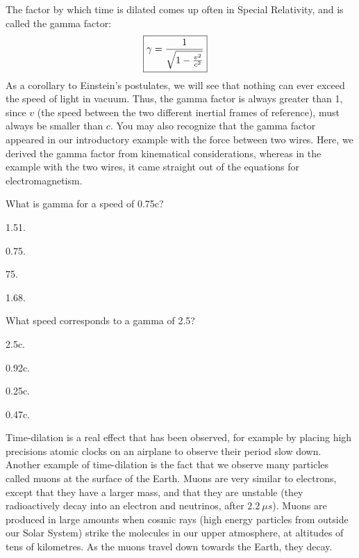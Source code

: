 The factor by which time is dilated comes up often in Special Relativity, and is called the gamma factor:
\begin{align*}
\Aboxed{\gamma = \frac{1}{\sqrt{1-\frac{v^2}{c^2}}}}
\end{align*}
As a corollary to Einstein's postulates, we will see that nothing can ever exceed the speed of light in vacuum. Thus, the gamma factor is always greater than 1, since $v$ (the speed between the two different inertial frames of reference), must always be smaller than $c$. You may also recognize that the gamma factor appeared in our introductory example with the force between two wires. Here, we derived the gamma factor from kinematical considerations, whereas in the example with the two wires, it came straight out of the equations for electromagnetism.

\begin{checkpoint}{}
	\begin{MCquestion}{What is gamma for a speed of 0.75c?}
		\item \SI{1.51}{}. \correct
		\item \SI{0.75}{}.
		\item \SI{75}{}.
		\item \SI{1.68}{}.
	\end{MCquestion}
\end{checkpoint}
\begin{checkpoint}{}
	\begin{MCquestion}{What speed corresponds to a gamma of \SI{2.5}{}?}
		\item \SI{2.5c}{}. 
		\item \SI{0.92c}{}. \correct
		\item \SI{0.25c}{}.
		\item \SI{0.47c}{}.
	\end{MCquestion}
\end{checkpoint}

Time-dilation is a real effect that has been observed, for example by placing high precisions atomic clocks on an airplane to observe their period slow down. Another example of time-dilation is the fact that we observe many particles called muons at the surface of the Earth. Muons are very similar to electrons, except that they have a larger mass, and that they are unstable (they radioactively decay into an electron and neutrinos, after $\SI{2.2}{\mu s}$). Muons are produced in large amounts when cosmic rays (high energy particles from outside our Solar System) strike the molecules in our upper atmosphere, at altitudes of tens of kilometres. As the muons travel down towards the Earth, they decay.

